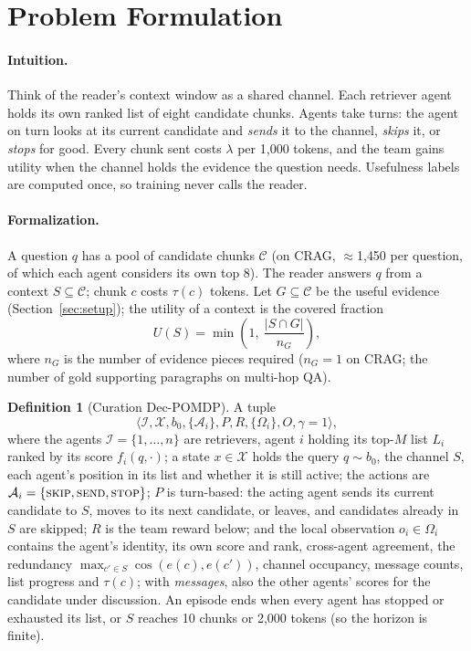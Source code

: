 \documentclass[sigconf,anonymous]{aamas}
\theoremstyle{plain}
\theoremstyle{definition}
\newtheorem{definition}{Definition}
\begin{document}
\section{Problem Formulation}

\paragraph{Intuition.} Think of the reader's context window as a shared channel. Each retriever agent holds its own ranked list of eight candidate chunks. Agents take turns: the agent on turn looks at its current candidate and \emph{sends} it to the channel, \emph{skips} it, or \emph{stops} for good. Every chunk sent costs $\lambda$ per 1{,}000 tokens, and the team gains utility when the channel holds the evidence the question needs. Usefulness labels are computed once, so training never calls the reader.

\paragraph{Formalization.} A question $q$ has a pool of candidate chunks $\mathcal{C}$ (on CRAG, $\approx$1{,}450 per question, of which each agent considers its own top 8). The reader answers $q$ from a context $S\subseteq\mathcal{C}$; chunk $c$ costs $\tau(c)$ tokens. Let $G\subseteq\mathcal{C}$ be the useful evidence (Section~\ref{sec:setup}); the utility of a context is the covered fraction
\begin{equation}
U(S)=\min\!\left(1,\ \frac{|S\cap G|}{n_G}\right),
\end{equation}
where $n_G$ is the number of evidence pieces required ($n_G=1$ on CRAG; the number of gold supporting paragraphs on multi-hop QA).

\begin{definition}[Curation Dec-POMDP]
A tuple
\[\langle \mathcal{I}, \mathcal{X}, b_0, \{\mathcal{A}_i\}, P, R, \{\Omega_i\}, O, \gamma=1\rangle,\]
where
the agents $\mathcal{I}=\{1,\dots,n\}$ are retrievers, agent $i$ holding its top-$M$ list $L_i$ ranked by its score $f_i(q,\cdot)$;
a state $x\in\mathcal{X}$ holds the query $q\sim b_0$, the channel $S$, each agent's position in its list and whether it is still active;
the actions are $\mathcal{A}_i=\{\textsc{skip},\textsc{send},\textsc{stop}\}$;
$P$ is turn-based: the acting agent sends its current candidate to $S$, moves to its next candidate, or leaves, and candidates already in $S$ are skipped;
$R$ is the team reward below;
and the local observation $o_i\in\Omega_i$ contains the agent's identity, its own score and rank, cross-agent agreement, the redundancy $\max_{c'\in S}\cos(e(c),e(c'))$, channel occupancy, message counts, list progress and $\tau(c)$; with \emph{messages}, also the other agents' scores for the candidate under discussion.
An episode ends when every agent has stopped or exhausted its list, or $S$ reaches 10 chunks or 2{,}000 tokens (so the horizon is finite).
\end{definition}
\end{document}
